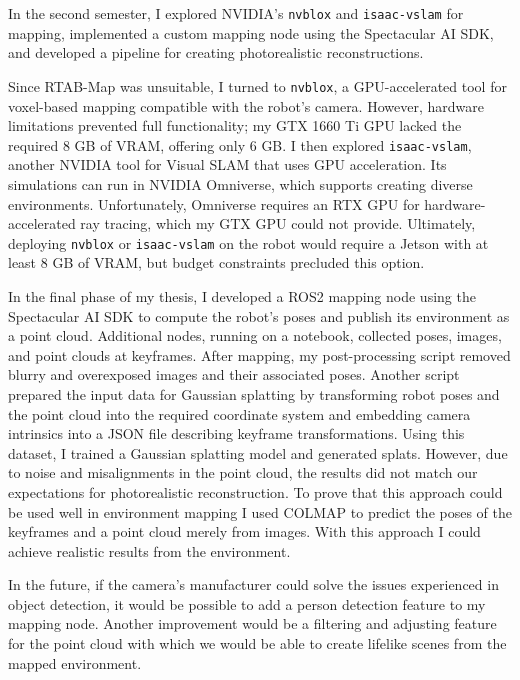 In the second semester, I explored NVIDIA's \verb|nvblox| and \verb|isaac-vslam| for mapping, implemented a custom mapping node using the Spectacular AI SDK, and developed a pipeline for creating photorealistic reconstructions.

Since RTAB-Map was unsuitable, I turned to \verb|nvblox|, a GPU-accelerated tool for voxel-based mapping compatible with the robot's camera. However, hardware limitations prevented full functionality; my GTX 1660 Ti GPU lacked the required 8 GB of VRAM, offering only 6 GB. I then explored \verb|isaac-vslam|, another NVIDIA tool for Visual SLAM that uses GPU acceleration. Its simulations can run in NVIDIA Omniverse, which supports creating diverse environments. Unfortunately, Omniverse requires an RTX GPU for hardware-accelerated ray tracing, which my GTX GPU could not provide. Ultimately, deploying \verb|nvblox| or \verb|isaac-vslam| on the robot would require a Jetson with at least 8 GB of VRAM, but budget constraints precluded this option.

In the final phase of my thesis, I developed a ROS2 mapping node using the Spectacular AI SDK to compute the robot's poses and publish its environment as a point cloud. Additional nodes, running on a notebook, collected poses, images, and point clouds at keyframes. After mapping, my post-processing script removed blurry and overexposed images and their associated poses. Another script prepared the input data for Gaussian splatting by transforming robot poses and the point cloud into the required coordinate system and embedding camera intrinsics into a JSON file describing keyframe transformations. Using this dataset, I trained a Gaussian splatting model and generated splats. However, due to noise and misalignments in the point cloud, the results did not match our expectations for photorealistic reconstruction. To prove that this approach could be used well in environment mapping I used COLMAP to predict the poses of the keyframes and a point cloud merely from images. With this approach I could achieve realistic results from the environment.

In the future, if the camera's manufacturer could solve the issues experienced in object detection, it would be possible to add a person detection feature to my mapping node. Another improvement would be a filtering and adjusting feature for the point cloud with which we would be able to create lifelike scenes from the mapped environment.
